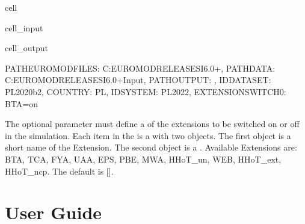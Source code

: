 \documentclass[letterpaper,10pt,english]{sphinxmanual}
\begin{document}
\begin{sphinxuseclass}{cell}
\begin{sphinxuseclass}{cell_input}
\begin{sphinxVerbatim}[commandchars=\\\{\}]
\end{sphinxVerbatim}

\end{sphinxuseclass}
\begin{sphinxuseclass}{cell_output}
\begin{sphinxVerbatim}[commandchars=\\\{\}]
\PYGZob{}\PYGZsq{}PATH\PYGZus{}EUROMODFILES\PYGZsq{}: \PYGZsq{}C:\PYGZbs{}\PYGZbs{}EUROMOD\PYGZus{}RELEASES\PYGZus{}I6.0+\PYGZsq{},
 \PYGZsq{}PATH\PYGZus{}DATA\PYGZsq{}: \PYGZsq{}C:\PYGZbs{}\PYGZbs{}EUROMOD\PYGZus{}RELEASES\PYGZus{}I6.0+\PYGZbs{}\PYGZbs{}Input\PYGZsq{},
 \PYGZsq{}PATH\PYGZus{}OUTPUT\PYGZsq{}: \PYGZsq{}\PYGZsq{},
 \PYGZsq{}ID\PYGZus{}DATASET\PYGZsq{}: \PYGZsq{}PL\PYGZus{}2020\PYGZus{}b2\PYGZsq{},
 \PYGZsq{}COUNTRY\PYGZsq{}: \PYGZsq{}PL\PYGZsq{},
 \PYGZsq{}ID\PYGZus{}SYSTEM\PYGZsq{}: \PYGZsq{}PL\PYGZus{}2022\PYGZsq{},
 \PYGZsq{}EXTENSION\PYGZus{}SWITCH0\PYGZsq{}: \PYGZsq{}BTA=on\PYGZsq{}\PYGZcb{}
\end{sphinxVerbatim}

\end{sphinxuseclass}
\end{sphinxuseclass}
\sphinxAtStartPar
The optional parameter  must define a  of the   extensions  to be switched on or off in the simulation. Each item in the  is   a  with two objects. The first object is a  short name of the Extension. The second object is a .  Available Extensions are: BTA, TCA, FYA, UAA, EPS, PBE, MWA, HHoT\_un, WEB, HHoT\_ext, HHoT\_ncp. The default is {[}{]}.

\sphinxstepscope


\section{User Guide}
\label{\detokenize{userguide:user-guide}}\label{\detokenize{userguide::doc}}
\end{document}
